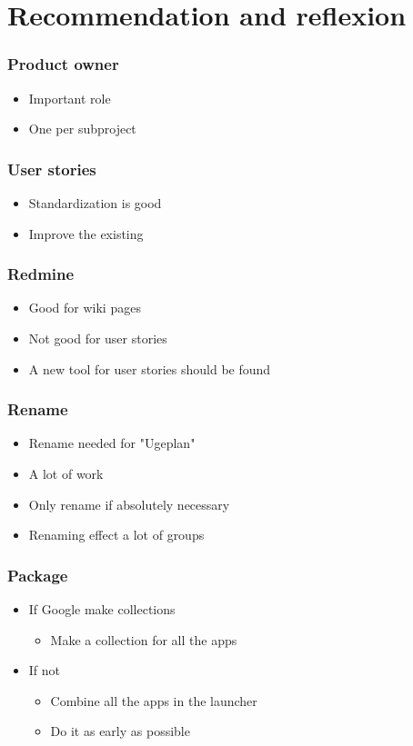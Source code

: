 \section{Recommendation and reflexion}
\begin{frame}
	\frametitle{Product owner}
	\begin{itemize}
		\item Important role
		\item One per subproject
	\end{itemize}
\end{frame}

\begin{frame}
	\frametitle{User stories}
	\begin{itemize}
		\item Standardization is good
		\item Improve the existing
	\end{itemize}
\end{frame}

\begin{frame}
	\frametitle{Redmine}
	\begin{itemize}
		\item Good for wiki pages
		\item Not good for user stories
		\item A new tool for user stories should be found
	\end{itemize}
\end{frame}

\begin{frame}
	\frametitle{Rename}
	\begin{itemize}
		\item Rename needed for "Ugeplan"
		\item A lot of work
		\item Only rename if absolutely necessary
		\item Renaming effect a lot of groups
	\end{itemize}
\end{frame}

\begin{frame}
	\frametitle{Package}
	\begin{itemize}
		\item If Google make collections
			\begin{itemize}
				\item Make a collection for all the apps
			\end{itemize}
		\item If not
			\begin{itemize}
				\item Combine all the apps in the launcher
				\item Do it as early as possible
			\end{itemize}
	\end{itemize}
\end{frame}


